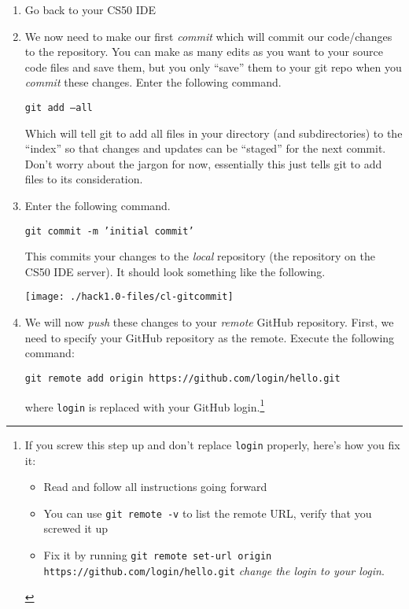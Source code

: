 \documentclass[12pt]{scrartcl}
\begin{document}
\begin{enumerate}
  \item Go back to your CS50 IDE
  
  \item We now need to make our first \emph{commit} which will commit
  our code/changes to the repository.  You can make as many edits as
  you want to your source code files and save them, but you only ``save''
  them to your git repo when you \emph{commit} these changes.  Enter
  the following command.
  
  \texttt{git add --all}
  
  Which will tell git to add all files in your directory 
  (and subdirectories) to the ``index'' so that changes and
  updates can be ``staged'' for the next commit.  Don't 
  worry about the jargon for now, essentially this just tells
  git to add files to its consideration.
  
  \item Enter the following command.

  \texttt{git commit -m 'initial commit'}
  
  This commits your changes to the \emph{local} repository
  (the repository on the CS50 IDE server).  It should look something
  like the following.
  
  \begin{center}
  \texttt{[image: ./hack1.0-files/cl-gitcommit]}
  \end{center}

  \item We will now \emph{push} these changes to your \emph{remote}
  GitHub repository.  First, we need to specify your GitHub 
  repository as the remote.  Execute the following command:
  
  \texttt{git remote add origin https://github.com/login/hello.git}
  
  where \texttt{login} is replaced with your GitHub login.\footnote{
  If you screw this step up and don't replace \texttt{login} properly, 
  here's how you fix it: 
  \begin{itemize}
    \item Read and follow all instructions going forward
    \item You can use \texttt{git remote -v} to list the remote URL, 
    verify that you screwed it up
    \item Fix it by running 
    \texttt{git remote set-url origin https://github.com/login/hello.git}
    \emph{change the login to your login}.
  \end{itemize}
  }
  

\end{enumerate}
\end{document}
